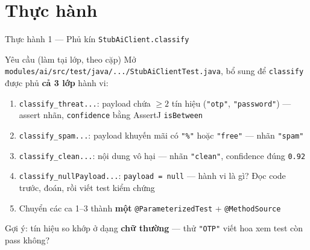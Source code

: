 \documentclass[aspectratio=169,12pt]{beamer}
\begin{document}
\section{Thực hành}

\begin{frame}[shrink=8]{Thực hành 1 --- Phủ kín \texttt{StubAiClient.classify}}
  \begin{block}{Yêu cầu (làm tại lớp, theo cặp)}
    Mở \texttt{modules/ai/src/test/java/.../StubAiClientTest.java},
    bổ sung để \texttt{classify} được phủ \textbf{cả 3 lớp} hành vi:
  \end{block}

  \vspace{0.3em}
  \begin{enumerate}
    \item \texttt{classify\_threat...}: payload chứa \(\ge 2\) tín hiệu
          (\texttt{"otp"}, \texttt{"password"}) --- assert nhãn,
          \texttt{confidence} bằng AssertJ \texttt{isBetween}
    \item \texttt{classify\_spam...}: payload khuyến mãi có \texttt{"\%"}
          hoặc \texttt{"free"} --- nhãn \texttt{"spam"}
    \item \texttt{classify\_clean...}: nội dung vô hại --- nhãn
          \texttt{"clean"}, confidence đúng \texttt{0.92}
    \item \texttt{classify\_nullPayload...}: \texttt{payload = null}
          --- hành vi là gì? Đọc code trước, đoán, rồi viết test kiểm chứng
    \item Chuyển các ca 1--3 thành \textbf{một}
          \texttt{@ParameterizedTest} + \texttt{@MethodSource}
  \end{enumerate}

  \vspace{0.3em}
  {\small Gợi ý: tín hiệu so khớp ở dạng \textbf{chữ thường} ---
  thử \texttt{"OTP"} viết hoa xem test còn pass không?}
\end{frame}
\end{document}

